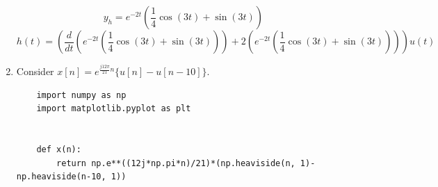 \documentclass{article}
\begin{document}
\begin{enumerate}
\begin{center}
\end{center}
\begin{equation}
    y_h = e^{-2t}\left(\frac{1}{4}\cos(3t)+\sin(3t)\right)
\end{equation}
\begin{equation}
    \boxed{h(t) = \left(\frac{d}{dt}\left(e^{-2t}\left(\frac{1}{4}\cos(3t)+\sin(3t)\right)\right)+ 2\left(e^{-2t}\left(\frac{1}{4}\cos(3t)+\sin(3t)\right)\right)\right)u(t)}
\end{equation}
\newpage
\item Consider $x[n] = e^{\frac{j12\pi}{21}n}\{u[n] - u[n - 10]\}$.

\lstset{language=Python}
\lstset{frame=lines}
\lstset{basicstyle=\footnotesize}
\begin{lstlisting}
    import numpy as np
    import matplotlib.pyplot as plt
    
    
    def x(n):
        return np.e**((12j*np.pi*n)/21)*(np.heaviside(n, 1)-np.heaviside(n-10, 1))
    

\end{lstlisting}
\end{enumerate}
\end{document}

